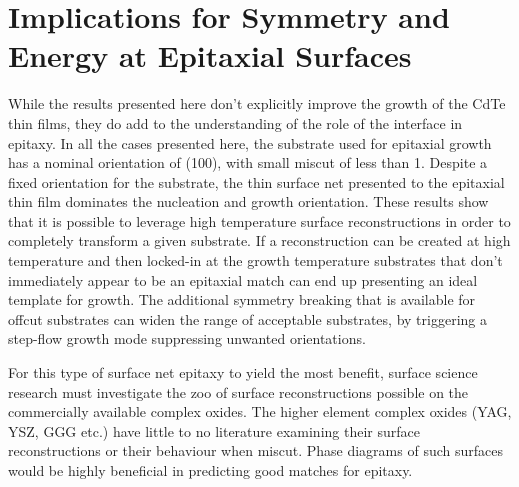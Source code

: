 \section{Implications for Symmetry and Energy at Epitaxial Surfaces}
While the results presented here don't explicitly improve the growth of the CdTe thin films, they do add to the understanding of the role of the interface in epitaxy.
In all the cases presented here, the substrate used for epitaxial growth has a nominal orientation of (100), with small miscut of less than 1\degree{}.
Despite a fixed orientation for the substrate, the thin surface net presented to the epitaxial thin film dominates the nucleation and growth orientation.
These results show that it is possible to leverage high temperature surface reconstructions in order to completely transform a given substrate.
If a reconstruction can be created at high temperature and then locked-in at the growth temperature substrates that don't immediately appear to be an epitaxial match can end up presenting an ideal template for growth.
The additional symmetry breaking that is available for offcut substrates can widen the range of acceptable substrates, by triggering a step-flow growth mode suppressing unwanted orientations.

For this type of surface net epitaxy to yield the most benefit, surface science research must investigate the zoo of surface reconstructions possible on the commercially available complex oxides.
The higher element complex oxides (YAG, YSZ, GGG etc.) have little to no literature examining their surface reconstructions or their behaviour when miscut.
Phase diagrams of such surfaces would be highly beneficial in predicting good matches for epitaxy.
